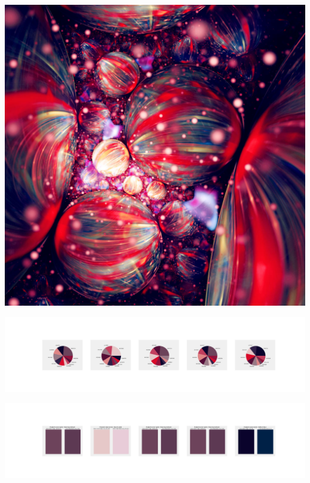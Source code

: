 \documentclass[11pt]{article}
\begin{document}
\begin{landscape}
    \begin{center}
    \includegraphics[width=\textwidth]{./nbimg/file (288).jpg}
    \end{center}

    \begin{center}
    \includegraphics[width=250mm]{./nbimg/pie-209.jpg}
    \end{center}

    \begin{center}
    \includegraphics[width=250mm]{./nbimg/peak-209.jpg}
    \end{center}
    


\end{landscape}
\end{document}
